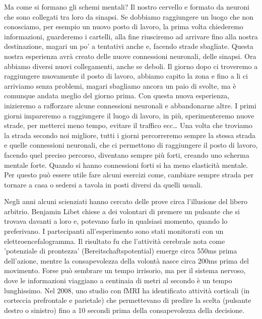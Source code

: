 \documentclass[12pt]{book} %
\begin{document}
Ma come si formano gli schemi mentali? Il nostro cervello e formato da neuroni che sono collegati tra loro da sinapsi. Se dobbiamo
raggiungere un luogo che non conosciamo, per esempio un nuovo posto di lavoro, la prima volta chiederemo informazioni,
guarderemo i cartelli, alla fine riusciremo ad arrivare fino alla nostra destinazione, magari un po' a tentativi anche
e, facendo strade sbagliate. Questa nostra esperienza avrà creato delle nuove connessioni neuronali, delle sinapsi. Ora
abbiamo diversi nuovi collegamenti, anche se deboli. Il giorno dopo ci troveremo a raggiungere nuovamente il posto di
lavoro, abbiamo capito la zona e fino a li ci arriviamo senza problemi, magari sbagliamo ancora un paio di svolte, ma è
comunque andata meglio del giorno prima. Con questa nuova esperienza, inizieremo a rafforzare alcune connessioni
neuronali e abbandonarne altre. I primi giorni impareremo a raggiungere il luogo di lavoro, in più, sperimenteremo
nuove strade, per metterci meno tempo, evitare il traffico ecc… Una volta che troviamo la strada secondo noi migliore,
tutti i giorni percorreremo sempre la stessa strada e quelle connessioni neuronali, che ci permettono di raggiungere il
posto di lavoro, facendo quel preciso percorso, diventano sempre più forti, creando uno scherma mentale forte. Quando
si hanno connessioni forti si ha meno elasticità mentale. Per questo può essere utile fare alcuni esercizi come,
cambiare sempre strada per tornare a casa o sedersi a tavola in posti diversi da quelli usuali.

Negli anni alcuni scienziati hanno cercato delle prove circa l'illusione del libero arbitrio.
Benjamin Libet chiese a dei volontari di premere un pulsante che si trovava davanti a loro e, potevano farlo in
qualsiasi momento, quando lo preferivano. I partecipanti all'esperimento sono stati monitorati con
un elettroencefalogramma. Il risultato fu che l'attività cerebrale nota come 'potenziale di prontezza' (Bereitschaftspotential) emerge circa 550ms prima dell’azione, mentre la consapevolezza della volontà nasce circa 200ms prima del movimento.
Forse può sembrare un tempo irrisorio, ma per il sistema nervoso, dove le informazioni viaggiano a centinaia di metri
al secondo è un tempo lunghissimo. Nel 2008, uno studio con fMRI ha identificato attività corticali (in corteccia prefrontale e parietale) che permettevano di predire la scelta (pulsante destro o sinistro) fino a 10 secondi prima della consapevolezza della decisione.
\end{document}
